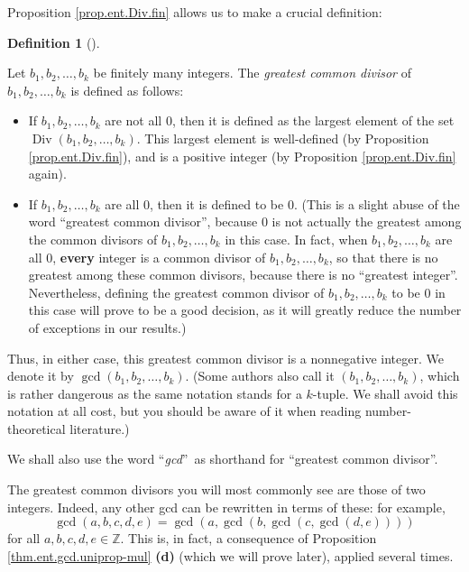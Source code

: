 \documentclass[numbers=enddot,12pt,final,onecolumn,notitlepage]{scrartcl}%
\numberwithin{exer}{subsection}
\theoremstyle{definition}
\newtheorem{defi}[theo]{Definition}
\newenvironment{definition}[1][]
{\begin{defi}[#1]\begin{leftbar}}
{\end{leftbar}\end{defi}}
\begin{document}
Proposition \ref{prop.ent.Div.fin} allows us to make a crucial definition:

\begin{definition}
\label{def.ent.gcd.gcd}Let $b_{1},b_{2},\ldots,b_{k}$ be finitely many
integers. The \textit{greatest common divisor} of $b_{1},b_{2},\ldots,b_{k}$
is defined as follows:

\begin{itemize}
\item If $b_{1},b_{2},\ldots,b_{k}$ are not all $0$, then it is defined as the
largest element of the set $\operatorname*{Div}\left(  b_{1},b_{2}%
,\ldots,b_{k}\right)  $. This largest element is well-defined (by Proposition
\ref{prop.ent.Div.fin}), and is a positive integer (by Proposition
\ref{prop.ent.Div.fin} again).

\item If $b_{1},b_{2},\ldots,b_{k}$ are all $0$, then it is defined to be $0$.
(This is a slight abuse of the word \textquotedblleft greatest common
divisor\textquotedblright, because $0$ is not actually the greatest among the
common divisors of $b_{1},b_{2},\ldots,b_{k}$ in this case. In fact, when
$b_{1},b_{2},\ldots,b_{k}$ are all $0$, \textbf{every} integer is a common
divisor of $b_{1},b_{2},\ldots,b_{k}$, so that there is no greatest among
these common divisors, because there is no \textquotedblleft greatest
integer\textquotedblright. Nevertheless, defining the greatest common divisor
of $b_{1},b_{2},\ldots,b_{k}$ to be $0$ in this case will prove to be a good
decision, as it will greatly reduce the number of exceptions in our results.)
\end{itemize}

Thus, in either case, this greatest common divisor is a nonnegative integer.
We denote it by $\gcd\left(  b_{1},b_{2},\ldots,b_{k}\right)  $. (Some authors
also call it $\left(  b_{1},b_{2},\ldots,b_{k}\right)  $, which is rather
dangerous as the same notation stands for a $k$-tuple. We shall avoid this
notation at all cost, but you should be aware of it when reading
number-theoretical literature.)

We shall also use the word \textquotedblleft\textit{gcd}\textquotedblright\ as
shorthand for \textquotedblleft greatest common divisor\textquotedblright.
\end{definition}

The greatest common divisors you will most commonly see are those of two
integers. Indeed, any other gcd can be rewritten in terms of these: for
example,%
\[
\gcd\left(  a,b,c,d,e\right)  =\gcd\left(  a,\gcd\left(  b,\gcd\left(
c,\gcd\left(  d,e\right)  \right)  \right)  \right)
\]
for all $a,b,c,d,e\in\mathbb{Z}$. This is, in fact, a consequence of
Proposition \ref{thm.ent.gcd.uniprop-mul} \textbf{(d)} (which we will prove
later), applied several times.
\end{document}
